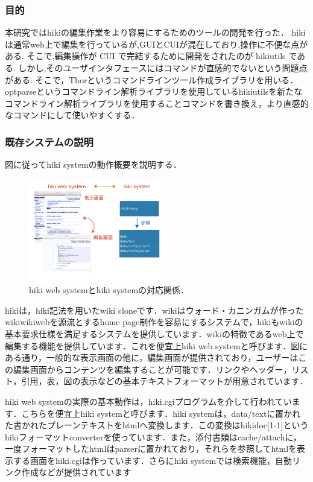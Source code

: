\subsubsection{目的}
本研究ではhikiの編集作業をより容易にするためのツールの開発を行った． 
hikiは通常web上で編集を行っているが,GUIとCUIが混在しており,操作に不便な点がある. 
そこで,編集操作が CUI で完結するために開発をされたのが hikiutils である. 
しかし,そのユーザインタフェースにはコマンドが直感的でないという問題点がある. 
そこで，Thorというコマンドラインツール作成ライブラリを用いる．
optparseというコマンドライン解析ライブラリを使用しているhikiutilsを新たなコマンドライン解析ライブラリを使用することコマンドを書き換え，より直感的なコマンドにして使いやすくする．

\subsubsection{既存システムの説明}
図に従ってhiki systemの動作概要を説明する．

\begin{figure}[htbp]\begin{center}
\includegraphics[width=6cm,bb=0 0 442 500]{../figs/./hikiutils_yamane_09_copy.001.jpg}
\caption{hiki web systemとhiki systemの対応関係．}
\label{default}\end{center}\end{figure}
hikiは，hiki記法を用いたwiki cloneです．wikiはウォード・カニンガムが作ったwikiwikiwebを源流とするhome page制作を容易にするシステムで，hikiもwikiの基本要求仕様を満足するシステムを提供しています．wikiの特徴であるweb上で編集する機能を提供しています．これを便宜上hiki web systemと呼びます．図にある通り，一般的な表示画面の他に，編集画面が提供されており，ユーザーはこの編集画面からコンテンツを編集することが可能です．リンクやヘッダー，リスト，引用，表，図の表示などの基本テキストフォーマットが用意されています．

hiki web systemの実際の基本動作は，hiki.cgiプログラムを介して行われています．こちらを便宜上hiki systemと呼びます．hiki systemは，data/textに置かれた書かれたプレーンテキストをhtmlへ変換します．この変換はhikidoc[1-1]というhikiフォーマットconverterを使っています．また，添付書類はcache/attachに，一度フォーマットしたhtmlはparserに置かれており，それらを参照してhtmlを表示する画面をhiki.cgiは作っています．さらにhiki systemでは検索機能，自動リンク作成などが提供されています

